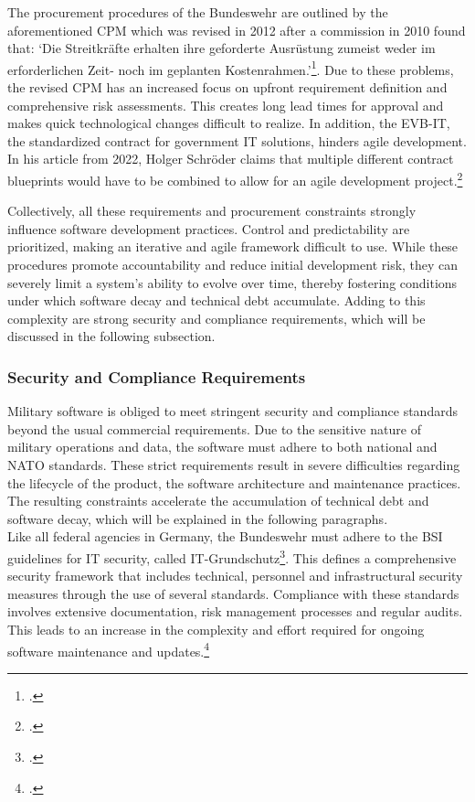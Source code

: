 The procurement procedures of the Bundeswehr are outlined by the aforementioned \ac{CPM} which was revised in 2012 after a commission in 2010 found that: 
`Die Streitkräfte erhalten ihre geforderte Ausrüstung zumeist weder im erforderlichen Zeit- noch im geplanten Kostenrahmen.'\footcite[36]{strukturkommissionderbundeswehrBerichtStrukturkommissionBundeswehr2010}.
Due to these problems, the revised \ac{CPM} has an increased focus on upfront requirement definition and comprehensive risk assessments. This creates long lead times
for approval and makes quick technological changes difficult to realize.
In addition, the \ac{EVB-IT}, the standardized contract for government IT solutions, hinders agile development. In his article from 2022,
Holger Schröder claims that multiple different contract blueprints would have to be combined to allow for an agile development project.\footcite{schroederUngeeignetFuerAgile2022}

Collectively, all these requirements and procurement constraints strongly influence software development practices. Control and predictability are prioritized, making
an iterative and agile framework difficult to use. While these procedures promote accountability and reduce initial development risk, they can severely limit a system's ability to evolve over time, thereby fostering conditions under which software decay and technical debt accumulate. 
Adding to this complexity are strong security and compliance requirements, which will be discussed in the following subsection.

\subsubsection{Security and Compliance Requirements}
Military software is obliged to meet stringent security and compliance standards beyond the usual commercial requirements. Due to the sensitive nature of military operations and data,
the software must adhere to both national and NATO standards. These strict requirements result in severe difficulties 
regarding the lifecycle of the product, the software architecture and maintenance practices. The resulting constraints accelerate the accumulation of technical debt and software decay, which will be explained in the following paragraphs.\\

Like all federal agencies in Germany, the Bundeswehr must adhere to the \ac{BSI} guidelines for IT security, called IT-Grundschutz\footcite{bundesamtfuersicherheitinderinformationstechnikBSIFAQ}. This defines a comprehensive security framework
that includes technical, personnel and infrastructural security measures through the use of several standards. Compliance with these standards involves extensive documentation, risk management processes and regular audits. 
This leads to an increase in the complexity and effort required for ongoing software maintenance and updates.\footcite{bundesamtfuersicherheitinderinformationstechnikBSIStandards}\\

